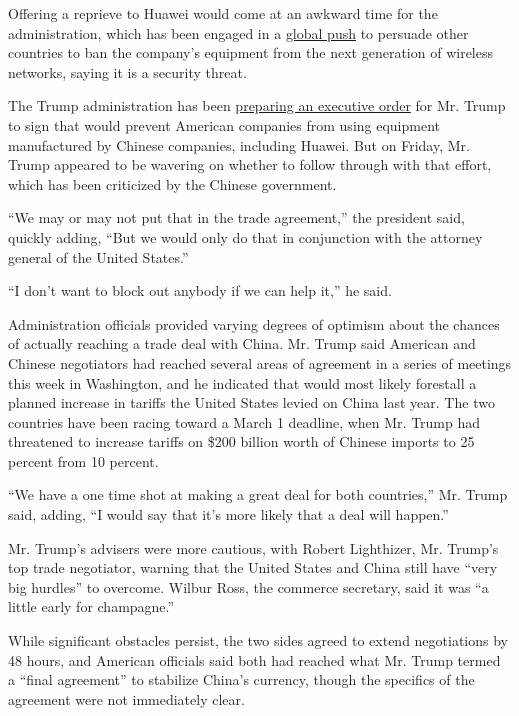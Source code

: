 Offering a reprieve to Huawei would come at an awkward time for the
administration, which has been engaged in a
\href{https://www.nytimes.com/2019/01/26/us/politics/huawei-china-us-5g-technology.htmlhttps://www.nytimes.com/2019/01/26/us/politics/huawei-china-us-5g-technology.html}{global
push} to persuade other countries to ban the company's equipment from
the next generation of wireless networks, saying it is a security
threat.

The Trump administration has been
\href{https://www.nytimes.com/2019/02/12/us/politics/trump-china-wireless-networks.html}{preparing
an executive order} for Mr. Trump to sign that would prevent American
companies from using equipment manufactured by Chinese companies,
including Huawei. But on Friday, Mr. Trump appeared to be wavering on
whether to follow through with that effort, which has been criticized by
the Chinese government.

``We may or may not put that in the trade agreement,'' the president
said, quickly adding, ``But we would only do that in conjunction with
the attorney general of the United States.''

``I don't want to block out anybody if we can help it,'' he said.

Administration officials provided varying degrees of optimism about the
chances of actually reaching a trade deal with China. Mr. Trump said
American and Chinese negotiators had reached several areas of agreement
in a series of meetings this week in Washington, and he indicated that
would most likely forestall a planned increase in tariffs the United
States levied on China last year. The two countries have been racing
toward a March 1 deadline, when Mr. Trump had threatened to increase
tariffs on \$200 billion worth of Chinese imports to 25 percent from 10
percent.

``We have a one time shot at making a great deal for both countries,''
Mr. Trump said, adding, ``I would say that it's more likely that a deal
will happen.''

Mr. Trump's advisers were more cautious, with Robert Lighthizer, Mr.
Trump's top trade negotiator, warning that the United States and China
still have ``very big hurdles'' to overcome. Wilbur Ross, the commerce
secretary, said it was ``a little early for champagne.''

While significant obstacles persist, the two sides agreed to extend
negotiations by 48 hours, and American officials said both had reached
what Mr. Trump termed a ``final agreement'' to stabilize China's
currency, though the specifics of the agreement were not immediately
clear.


